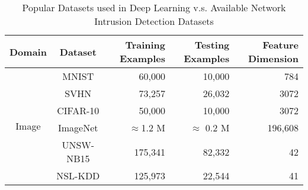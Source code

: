 \begin{table}[ht]
\centering
\caption[Network Intrusion Detection Datasets]{Popular Datasets used in Deep Learning v.s. Available Network Intrusion Detection Datasets}
\label{CDL:Tab:Datasets}
\begin{tabular}{c|c|r|r|r}
\multicolumn{1}{c|}{Domain}                          & Dataset       & Training Examples & Testing Examples & Feature Dimension \\
\hline
\hline
\multirow{6}{*}{Image}                               & MNIST         & 60,000            & 10,000           & 784     \\
                                                     & SVHN          & 73,257            & 26,032           & 3072    \\
                                                     & CIFAR-10      & 50,000            & 10,000           & 3072    \\
                                                     & ImageNet      & $\approx$1.2 M    & $\approx$ 0.2 M  & 196,608 \\
\hline
\multicolumn{1}{c|}{\multirow{2}{*}{NIDS}}           & UNSW-NB15     & 175,341           & 82,332            & 42      \\
\multicolumn{1}{l|}{}                                & NSL-KDD       & 125,973           & 22,544            & 41      
\end{tabular}
\end{table}
